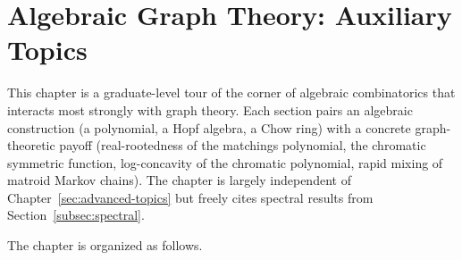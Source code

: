 \clearpage
\section{Algebraic Graph Theory: Auxiliary Topics}

This chapter is a graduate-level tour of the corner of algebraic
combinatorics that interacts most strongly with graph theory.
Each section pairs an algebraic construction (a polynomial, a Hopf
algebra, a Chow ring) with a concrete graph-theoretic payoff
(real-rootedness of the matchings polynomial, the chromatic symmetric
function, log-concavity of the chromatic polynomial, rapid mixing of
matroid Markov chains). The chapter is largely independent of
Chapter~\ref{sec:advanced-topics} but freely cites spectral results from Section~\ref{subsec:spectral}.

The chapter is organized as follows.

